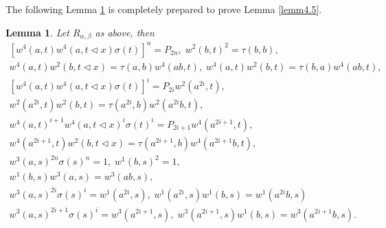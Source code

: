 \documentclass[a4paper,11pt]{amsart}
\numberwithin{equation}{section}
\newtheorem{lemma}[theorem]{Lemma}
\begin{document}
The following Lemma \ref{lemm4.4} is completely prepared to prove Lemma \ref{lemm4.5}.
\begin{lemma}\label{lemm4.4}
Let $R_{\alpha,\beta}$ as above, then
\begin{gather}
\label{w.1} [w^4(a,t)w^4(a,t\triangleleft x)\sigma(t)]^n=P_{2n},\;w^2(b,t)^2=\tau(b,b),\\
\label{w.2} w^4(a,t)w^2(b,t\triangleleft x)=\tau(a,b)w^4(ab,t),\;w^4(a,t)w^2(b,t)=\tau(b,a)w^4(ab,t),\\
\label{w.3} [w^4(a,t) w^4(a,t\triangleleft x)\sigma(t)]^i=P_{2i}w^2(a^{2i},t),\\
\label{w.4} w^2(a^{2i},t) w^2(b,t)=\tau(a^{2i},b) w^2(a^{2i}b,t),\\
\label{w.5} w^4(a,t)^{i+1} w^4(a,t\triangleleft x)^i \sigma(t)^i=P_{2i+1} w^4(a^{2i+1},t),\\
\label{w.6} w^4(a^{2i+1},t) w^2(b,t \triangleleft x)=\tau(a^{2i+1},b) w^4(a^{2i+1}b,t),\\
\label{w.7} w^3(a,s)^{2n}\sigma(s)^n=1,\;w^1(b,s)^2=1,\\
\label{w.8} w^1(b,s) w^3(a,s)=w^3(ab,s),\\
\label{w.9} w^3(a,s)^{2i} \sigma(s)^i=w^1(a^{2i},s),\;w^1(a^{2i},s) w^1(b,s)=w^1(a^{2i}b,s)\\
\label{w.10} w^3(a,s)^{2i+1}\sigma(s)^i=w^3(a^{2i+1},s),\;w^3(a^{2i+1},s) w^1(b,s)=w^3(a^{2i+1}b,s).
\end{gather}
\end{lemma}
\end{document}
